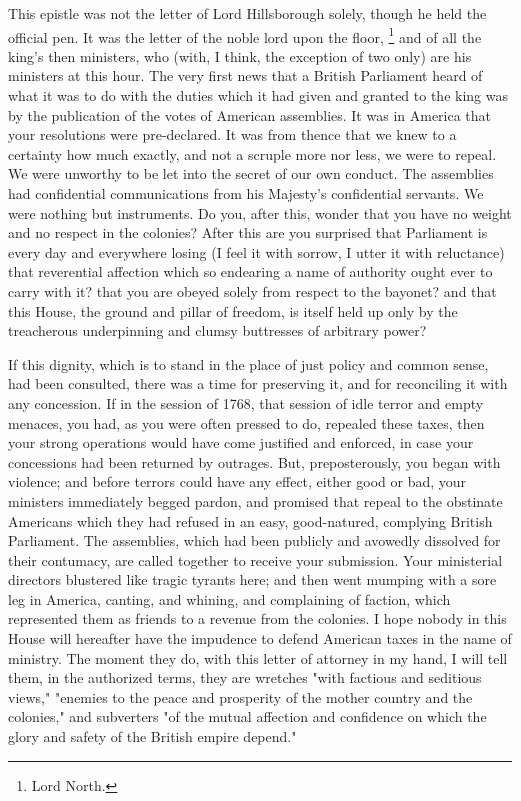 This epistle was not the letter of Lord Hillsborough solely, though he held the official pen. It was the letter of the noble lord upon the floor,
\footnote{Lord North.}
and of all the king's then ministers, who (with, I think, the exception of two only) are his ministers at this hour. The very first news that a British Parliament heard of what it was to do with the duties which it had given and granted to the king was by the publication of the votes of American assemblies. It was in America that your resolutions were pre-declared. It was from thence that we knew to a certainty how much exactly, and not a scruple more nor less, we were to repeal. We were unworthy to be let into the secret of our own conduct. The assemblies had confidential communications from his Majesty's confidential servants. We were nothing but instruments. Do you, after this, wonder that you have no weight and no respect in the colonies? After this are you surprised that Parliament is every day and everywhere losing (I feel it with sorrow, I utter it with reluctance) that reverential affection which so endearing a name of authority ought ever to carry with it? that you are obeyed solely from respect to the bayonet? and that this House, the ground and pillar of freedom, is itself held up only by the treacherous underpinning and clumsy buttresses of arbitrary power?

If this dignity, which is to stand in the place of just policy and common sense, had been consulted, there was a time for preserving it, and for reconciling it with any concession. If in the session of 1768, that session of idle terror and empty menaces, you had, as you were often pressed to do, repealed these taxes, then your strong operations would have come justified and enforced, in case your concessions had been returned by outrages. But, preposterously, you began with violence; and before terrors could have any effect, either good or bad, your ministers immediately begged pardon, and promised that repeal to the obstinate Americans which they had refused in an easy, good-natured, complying British Parliament. The assemblies, which had been publicly and avowedly dissolved for their contumacy, are called together to receive your submission. Your ministerial directors blustered like tragic tyrants here; and then went mumping with a sore leg in America, canting, and whining, and complaining of faction, which represented them as friends to a revenue from the colonies. I hope nobody in this House will hereafter have the impudence to defend American taxes in the name of ministry. The moment they do, with this letter of attorney in my hand, I will tell them, in the authorized terms, they are wretches "with factious and seditious views," "enemies to the peace and prosperity of the mother country and the colonies," and subverters "of the mutual affection and confidence on which the glory and safety of the British empire depend."


